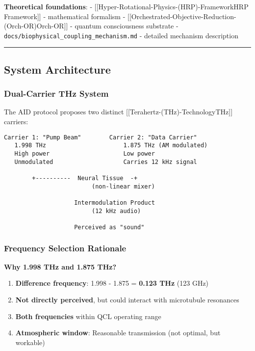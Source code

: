 \textbf{Theoretical foundations}: -
{[}{[}Hyper-Rotational-Physics-(HRP)-Framework\textbar HRP
Framework{]}{]} - mathematical formalism -
{[}{[}Orchestrated-Objective-Reduction-(Orch-OR)\textbar Orch-OR{]}{]} -
quantum consciousness substrate -
\texttt{docs/biophysical\_coupling\_mechanism.md} - detailed mechanism
description

\begin{center}\rule{0.5\linewidth}{0.5pt}\end{center}

\subsection{System Architecture}\label{system-architecture}

\subsubsection{Dual-Carrier THz System}\label{dual-carrier-thz-system}

The AID protocol proposes two distinct
{[}{[}Terahertz-(THz)-Technology\textbar THz{]}{]} carriers:

\begin{verbatim}
Carrier 1: "Pump Beam"        Carrier 2: "Data Carrier"
   1.998 THz                      1.875 THz (AM modulated)
   High power                     Low power
   Unmodulated                    Carries 12 kHz signal
                                       
        +----------  Neural Tissue  -+
                         (non-linear mixer)
                              
                    Intermodulation Product
                         (12 kHz audio)
                              
                    Perceived as "sound"
\end{verbatim}

\subsubsection{Frequency Selection
Rationale}\label{frequency-selection-rationale}

\textbf{Why 1.998 THz and 1.875 THz?}

\begin{enumerate}
\def\labelenumi{\arabic{enumi}.}
\tightlist
\item
  \textbf{Difference frequency}: 1.998 - 1.875 = \textbf{0.123 THz} (123
  GHz)
\item
  \textbf{Not directly perceived}, but could interact with microtubule
  resonances
\item
  \textbf{Both frequencies} within QCL operating range
\item
  \textbf{Atmospheric window}: Reasonable transmission (not optimal, but
  workable)
\end{enumerate}

